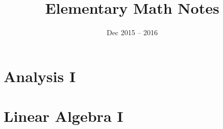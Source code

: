 \documentclass{article}
\title{Elementary Math Notes}
\date{Dec 2015 -- 2016}
\begin{document}
\maketitle
\newpage
\tableofcontents
\newpage

\part{Analysis I}
\newpage

\newpage

\part{Linear Algebra I}
\newpage

\newpage
\end{document}
